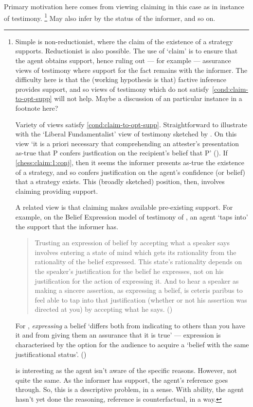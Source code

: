 \documentclass[10pt]{article}
\begin{document}
Primary motivation here comes from viewing claiming in this case as in instance of testimony.\nolinebreak
\footnote{
  Simple is non-reductionist, where the claim of the existence of a strategy supports.
  Reductionist is also possible.
  The use of `claim' is to ensure that the agent obtains support, hence ruling out --- for example --- assurance views of testimony where support for the fact remains with the informer.
  The difficulty here is that the (working hypothesis is that) factive inference provides support, and so views of testimony which do not satisfy~\ref{cond:claim-to-opt-supp} will not help.
  {
    \color{red}
    Maybe a discussion of an particular instance in a footnote here?
  }

  Variety of views satisfy \ref{cond:claim-to-opt-supp}.
  Straightforward to illustrate with the `Liberal Fundamentalist' view of testimony sketched by \citeauthor{Graham:2006vs}.
  On this view `it is a priori necessary that comprehending an attester's presentation as-true that P confers justfication on the recipient's belief that P' (\citeyear[94]{Graham:2006vs}).
  If \ref{chess:claim:1:conj}, then it seems the informer presents as-true the existence of a strategy, and so confers justification on the agent's confidence (or belief) that a strategy exists.
  This (broadly sketched) position, then, involves claiming providing support.

  A related view is that claiming makes available pre-existing support.
  For example, on the Belief Expression model of testimony of \textcite{Owens:2006tw}, an agent `taps into' the support that the informer has.
  \begin{quote}
    Trusting an expression of belief by accepting what a speaker says involves entering a state of mind which gets its rationality from the rationality of the belief expressed.
    This state’s rationality depends on the speaker’s justification for the belief he expresses, not on his justification for the action of expressing it.
    And to hear a speaker as making a sincere assertion, as expressing a belief, is ceteris paribus to feel able to tap into that justification (whether or not his assertion was directed at you) by accepting what he says.\nolinebreak
    \mbox{}\hfill\mbox{(\citeyear[123]{Owens:2006tw})}
  \end{quote}
  For \citeauthor{Owens:2006tw}, \emph{expressing} a belief `differs both from indicating to others than you have it and from giving them an assurance that it is true' --- expression is characterised by the option for the audience to acquire a `belief with the same justificational status'.
  (\citeyear[106]{Owens:2006tw})

  \citeauthor{Owens:2006tw} is interesting as the agent isn't aware of the specific reasons.
  However, not quite the same.
  As the informer has support, the agent's reference goes through.
  So, this is a descriptive problem, in a sense.
  With ability, the agent hasn't yet done the reasoning, reference is counterfactual, in a way.
}
May also infer by the status of the informer, and so on.
\end{document}
